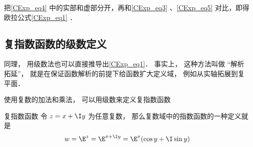 把\autoref{CExp_eq4} 中的实部和虚部分开，再和\autoref{CExp_eq3} 、\autoref{CExp_eq5} 对比，即得欧拉公式\autoref{CExp_eq1} ．

\subsection{复指数函数的级数定义}
同理， 用级数法也可以直接推导出\autoref{CExp_eq1}． 事实上， 这种方法叫做 “解析拓延”， 就是在保证函数解析的前提下给函数扩大定义域， 例如从实轴拓展到复平面．

使用复数的加法和乘法， 可以用级数来定义复指数函数
\begin{definition}{复指数函数}
令 $z = x + \I y$ 为任意复数， 那么复数域中的指数函数的一种定义就是
\begin{equation}
w = \E^z = \E^{x + \I y} = \E^x(\cos y + \I\sin y)
\end{equation}
\end{definition}
